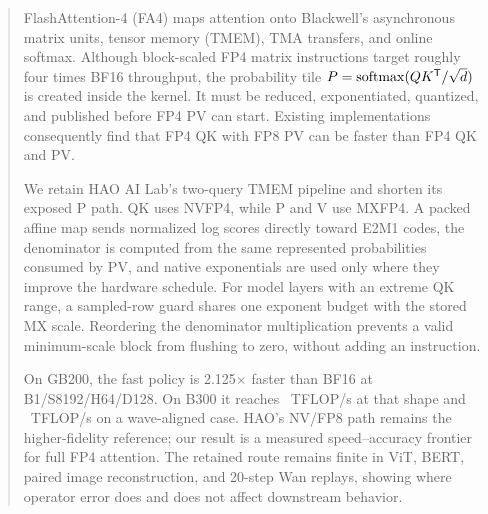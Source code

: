 \begin{abstract}
FlashAttention-4 (FA4) maps attention onto Blackwell's asynchronous matrix
units, tensor memory (TMEM), TMA transfers, and online softmax. Although
block-scaled FP4 matrix instructions target roughly four times BF16
throughput, the probability tile $P=\softmax(QK^\mathsf{T}/\sqrt d)$ is
created inside the kernel. It must be reduced, exponentiated, quantized, and
published before FP4 PV can start. Existing implementations consequently find
that FP4 QK with FP8 PV can be faster than FP4 QK and PV.

We retain HAO AI Lab's two-query TMEM pipeline and shorten its exposed P path.
QK uses NVFP4, while P and V use MXFP4. A packed affine map sends normalized
log scores directly toward E2M1 codes, the denominator is computed from the
same represented probabilities consumed by PV, and native exponentials are
used only where they improve the hardware schedule. For model layers with an
extreme QK range, a sampled-row guard shares one exponent budget with the
stored MX scale. Reordering the denominator multiplication prevents a valid
minimum-scale block from flushing to zero, without adding an instruction.

On GB200, the fast policy is 2.125$\times$ faster than BF16 at
B1/S8192/H64/D128. On B300 it reaches \BThreeThreeKStandardTflops\ TFLOP/s
at that shape and \BThreeThreeKPeakTflops\ TFLOP/s on a wave-aligned case.
HAO's NV/FP8 path remains the higher-fidelity reference; our result is a
measured speed--accuracy frontier for full FP4 attention. The retained route
remains finite in ViT, BERT, paired image reconstruction, and 20-step Wan
replays, showing where operator error does and does not affect downstream
behavior.
\end{abstract}
